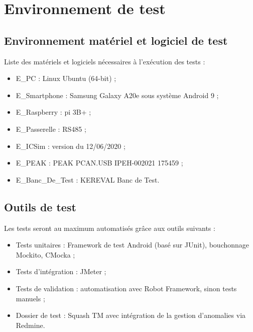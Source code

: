 
\section{Environnement de test}
\label{sec:env}

\subsection{Environnement matériel et logiciel de test}
\label{sec:env:env}

Liste des matériels et logiciels nécessaires à l'exécution des tests :
\begin{itemize}
    \item E\_PC : Linux Ubuntu (64-bit) ;
    \item E\_Smartphone : Samsung Galaxy A20e sous système Android 9 ;
    \item E\_Raspberry : pi 3B+ ;
    \item E\_Passerelle : RS485 ;
    \item E\_ICSim : version du 12/06/2020 ;
    \item E\_PEAK : PEAK PCAN.USB IPEH-002021 175459 ;
    \item E\_Banc\_De\_Test : KEREVAL Banc de Test.
\end{itemize}

\subsection{Outils de test}
\label{sec:env:outils}

Les tests seront au maximum automatisés grâce aux outils suivants :
\begin{itemize}
    \item Tests unitaires : Framework de test Android (basé sur JUnit), bouchonnage Mockito, CMocka ;
    \item Tests d'intégration : JMeter ;
    \item Tests de validation : automatisation avec Robot Framework, sinon tests manuels ;
    \item Dossier de test : Squash TM avec intégration de la gestion d'anomalies via Redmine.
\end{itemize}
